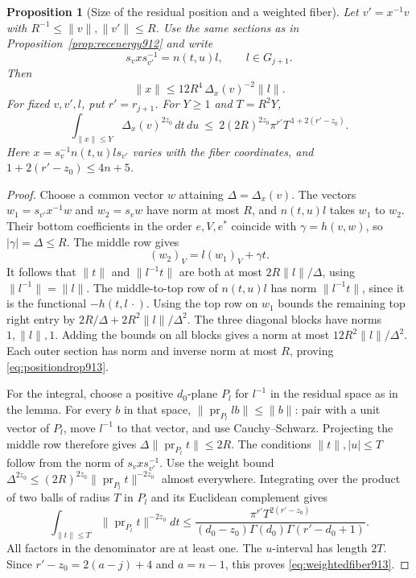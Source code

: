 \documentclass[a4paper,11pt]{article}
\newtheorem{proposition}{Proposition}[section]
\theoremstyle{definition}
\theoremstyle{remark}
\numberwithin{equation}{section}
\begin{document}
\begin{proposition}[Size of the residual position and a weighted fiber]
\leavevmode\label{prop:positiondrop913}
Let \(v'=x^{-1}v\) with \(R^{-1}\le\|v\|,\|v'\|\le R\).
Use the same sections as in Proposition~\ref{prop:recenergy912}
and write
\[
        s_v x s_{v'}^{-1}=n(t,u)l,\qquad l\in G_{j+1}.
\]
Then
\begin{equation}
     \|x\|\le 12R^4\,\Delta_x(v)^{-2}\|l\| .
 \label{eq:positiondrop913}
\end{equation}
For fixed \(v,v',l\), put \(r'=r_{j+1}\). For \(Y\ge1\)
and \(T=R^2Y\),
\begin{equation}
 \int_{\|x\|\le Y}\Delta_x(v)^{2z_0}\,dt\,du
       \ \le\ 2(2R)^{2z_0}\pi^{r'}T^{\,1+2(r'-z_0)} .
 \label{eq:weightedfiber913}
\end{equation}
Here \(x=s_v^{-1}n(t,u)l s_{v'}\) varies with the fiber
coordinates, and \(1+2(r'-z_0)\le 4n+5\).
\end{proposition}
\begin{proof}
Choose a common vector \(w\) attaining \(\Delta=\Delta_x(v)\).
The vectors \(w_1=s_{v'}x^{-1}w\) and \(w_2=s_v w\) have
norm at most \(R\), and \(n(t,u)l\) takes \(w_1\) to \(w_2\).
Their bottom coefficients in the order \(e,V,e^*\) coincide
with \(\gamma=h(v,w)\), so \(|\gamma|=\Delta\le R\).
The middle row gives
\[
             (w_2)_V=l(w_1)_V+\gamma t .
\]
It follows that \(\|t\|\) and \(\|l^{-1}t\|\) are both at most
\(2R\|l\|/\Delta\), using \(\|l^{-1}\|=\|l\|\).
The middle-to-top row of \(n(t,u)l\) has norm
\(\|l^{-1}t\|\), since it is the functional \(-h(t,l\,\cdot)\).
Using the top row on \(w_1\) bounds the remaining top right entry
by \(2R/\Delta+2R^2\|l\|/\Delta^2\).
The three diagonal blocks have norms \(1,\|l\|,1\).
Adding the bounds on all blocks gives a norm at most
\(12R^2\|l\|/\Delta^2\). Each outer section has norm and
inverse norm at most \(R\), proving \eqref{eq:positiondrop913}.

For the integral, choose a positive \(d_0\)-plane \(P_l\) for
\(l^{-1}\) in the residual space as in the lemma.
For every \(b\) in that space,
\(\|\operatorname{pr}_{P_l}lb\|\le\|b\|\): pair with a unit
vector of \(P_l\), move \(l^{-1}\) to that vector, and use
Cauchy--Schwarz. Projecting the middle row therefore gives
\(\Delta\|\operatorname{pr}_{P_l}t\|\le2R\). The conditions
\(\|t\|,|u|\le T\) follow from the norm of \(s_v x s_{v'}^{-1}\).
Use the weight bound
\(\Delta^{2z_0}\le(2R)^{2z_0}\|\operatorname{pr}_{P_l}t\|^{-2z_0}\)
almost everywhere. Integrating over the product of two balls
of radius \(T\) in \(P_l\) and its Euclidean complement gives
\[
 \int_{\|t\|\le T}\|\operatorname{pr}_{P_l}t\|^{-2z_0}dt
 \le \frac{\pi^{r'} T^{2(r'-z_0)}}
 {(d_0-z_0)\Gamma(d_0)\Gamma(r'-d_0+1)}.
\]
All factors in the denominator are at least one. The
\(u\)-interval has length \(2T\). Since
\(r'-z_0=2(a-j)+4\) and \(a=n-1\), this proves
\eqref{eq:weightedfiber913}.
\end{proof}
\clearpage
\end{document}
